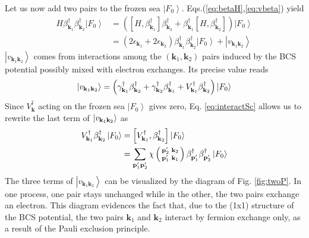 \documentclass[aps,prb,superscriptaddress,showpacs,reprint,lengthcheck]{revtex4-1}
\newcommand{\vk}{\ensuremath{\mathbf{k}}}
\newcommand{\vp}{\ensuremath{\mathbf{p}}}
\begin{document}
Let us now add two pairs to the frozen sea $\left|F_0\right>$. Eqs.(\ref{eq:betaH},\ref{eq:vbeta}) yield 
\begin{equation}  \label{eq:SchTwo}
\begin{split}
H\beta^{\dagger}_{\mathbf{k} _1}\beta^{\dagger}_{\mathbf{k}
_2}\left|F_0\right>   &=\left(\left[H,\beta^{\dagger}_{\mathbf{k} _1}\right]
\beta^{\dagger}_{\mathbf{k} _2}+\beta^{\dagger}_{\mathbf{k} _1}\left[%
H,\beta^{\dagger}_{\mathbf{k} _2}\right]  \right) \left|F_0\right>   \\
&=\left(2\epsilon_{\mathbf{k} _1}+2\epsilon_{\mathbf{k} _2}\right)
\beta^{\dagger}_{\mathbf{k} _1}\beta^{\dagger}_{\mathbf{k}
_2}\left|F_0\right>  +\left|v_{\mathbf{k} _1\mathbf{k} _2}\right> 
\end{split}%
\end{equation}
$\left|v_{\mathbf{k} _1\mathbf{k} _2}\right> $ comes from interactions
among the $\left(\mathbf{k} _1,\mathbf{k} _2\right) $ pairs induced by the
BCS potential possibly mixed with electron exchanges. Its precise value reads 
\begin{equation}
\left|v_{\mathbf{k} _1\mathbf{k} _2}\right> =\left(\gamma^{\dagger}_{\mathbf{%
k} _1}\beta^{\dagger}_{\mathbf{k} _2}+\gamma^{\dagger}_{\mathbf{k}
_2}\beta^{\dagger}_{\mathbf{k} _1}+V^{\dagger}_{\mathbf{k}
_1}\beta^{\dagger}_{\mathbf{k} _2}\right) \left|F_0\right>  
\end{equation}
Since $V^{\dagger}_{\mathbf{k}}$ acting on the frozen sea $\left|F_0\right>$ gives zero,  Eq. \eqref{eq:interactSc} allows us to rewrite the last term of $\left|v_{%
\mathbf{k} _1\mathbf{k} _2}\right> $ as 
\begin{eqnarray}
V^{\dagger}_{\mathbf{k} _1}\beta^{\dagger}_{\mathbf{k} _2}\left|F_0\right>  =%
\left[V^{\dagger}_{\mathbf{k} _1},\beta^{\dagger}_{\mathbf{k} _2}\right] 
\left|F_0\right> \hspace{1.8cm} \nonumber\\
 = \sum_{\mathbf{p} ^{\prime}_1\mathbf{p}
^{\prime}_2}\chi\left(\begin{smallmatrix}\vp'_2&\vk_2\\\vp'_1&\vk_1%
\end{smallmatrix}\right)  \beta^{\dagger}_{\mathbf{p} ^{\prime}_1}\beta^{%
\dagger}_{\mathbf{p} ^{\prime}_2}\left|F_0\right>  
\end{eqnarray}
The three terms of  $\left|v_{\mathbf{k} _1\mathbf{k} _2}\right> $ can be visualized by
the diagram of Fig. \ref{fig:twoP}. In one process, one pair stays unchanged while in the other, the two pairs exchange an electron. This diagram evidences the fact that,
due to the (1x1) structure of the BCS potential, the two pairs $\mathbf{k} _1$
and $\mathbf{k} _2$ interact by fermion exchange only, as a result of the
Pauli exclusion principle.
\end{document}
